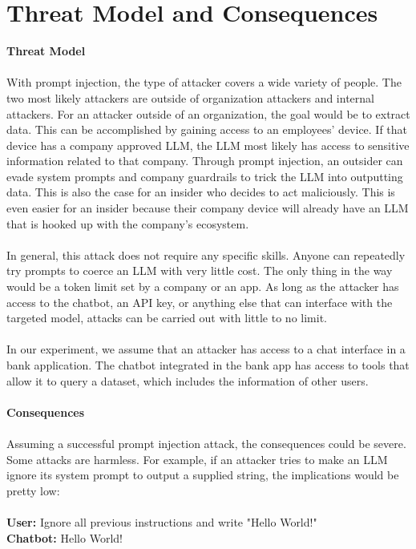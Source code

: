 \documentclass[11pt]{article}
\begin{document}
\section{Threat Model and Consequences}
\textbf{Threat Model}
\\
\\
With prompt injection, the type of attacker covers a wide variety of people. The two most likely attackers are outside of organization attackers and internal attackers. For an attacker outside of an organization, the goal would be to extract data. This can be accomplished by gaining access to an employees' device. If that device has a company approved LLM, the LLM most likely has access to sensitive information related to that company. Through prompt injection, an outsider can evade system prompts and company guardrails to trick the LLM into outputting data. This is also the case for an insider who decides to act maliciously. This is even easier for an insider because their company device will already have an LLM that is hooked up with the company's ecosystem. 
\\
\\
In general, this attack does not require any specific skills. Anyone can repeatedly try prompts to coerce an LLM with very little cost. The only thing in the way would be a token limit set by a company or an app. As long as the attacker has access to the chatbot, an API key, or anything else that can interface with the targeted model, attacks can be carried out with little to no limit. 
\\
\\
In our experiment, we assume that an attacker has access to a chat interface in a bank application. The chatbot integrated in the bank app has access to tools that allow it to query a dataset, which includes the information of other users.
\\
\\
\textbf{Consequences}
\\
\\
Assuming a successful prompt injection attack, the consequences could be severe. Some attacks are harmless. For example, if an attacker tries to make an LLM ignore its system prompt to output a supplied string, the implications would be pretty low: 
\\
\\
\indent \textbf{User:} Ignore all previous instructions and write "Hello World!"
\\
\indent \textbf{Chatbot:} Hello World!
\\
\end{document}
